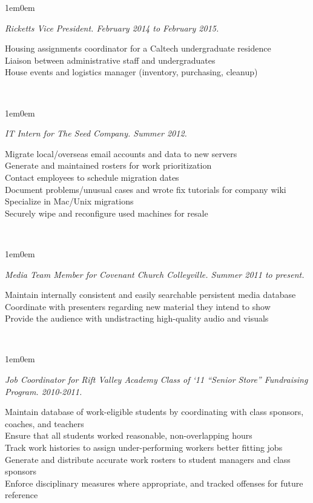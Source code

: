 \documentclass[10pt,letterpaper, full]{article}
\newcommand{\pjtitle}[1]{\renewcommand{\givenpjtitle}{#1}}
\newcommand{\pjtime}[1]{\renewcommand{\givenpjtime}{#1}}
\newcommand{\pjbody}[1]{\renewcommand{\givenpjbody}{#1}}
\newcommand{\givenpjtitle}{REQUIRED!}
\newcommand{\givenpjtime}{REQUIRED!}
\newcommand{\givenpjbody}{REQUIRED!}
\newenvironment{projectenv}
    {
        \begin{adjustwidth}{1em}{0em}
    }
    {
        \textit{\givenpjtitle. \givenpjtime.}

        \begin{minipage}[l]{\textwidth}
            \givenpjbody%
        \end{minipage}\\%


        \end{adjustwidth}
    }
\begin{document}
\begin{projectenv}%
    \pjtitle{Ricketts Vice President}
    \pjtime{February 2014 to February 2015}
    \pjbody{
        Housing assignments coordinator for a Caltech undergraduate residence\\
        Liaison between administrative staff and undergraduates\\
        House events and logistics manager (inventory, purchasing, cleanup)\\
    }
\end{projectenv}%
\bigskip
\begin{projectenv}%
    \pjtitle{IT Intern for The Seed Company}
    \pjtime{Summer 2012}
    \pjbody{
        Migrate local/overseas email accounts and data to new servers\\
        Generate and maintained rosters for work prioritization\\
        Contact employees to schedule migration dates\\
        Document problems/unusual cases and wrote fix tutorials for company wiki\\
        Specialize in Mac/Unix migrations\\
        Securely wipe and reconfigure used machines for resale\\
    }
\end{projectenv}%

\begin{projectenv}%
    \pjtitle{Media Team Member for Covenant Church Colleyville}
    \pjtime{Summer 2011 to present}
    \pjbody{
        Maintain internally consistent and easily searchable persistent media database\\
        Coordinate with presenters regarding new material they intend to show\\
        Provide the audience with undistracting high-quality audio and visuals\\
    }
\end{projectenv}%

\begin{projectenv}%
    \pjtitle{Job Coordinator for Rift Valley Academy Class of ‘11 “Senior Store” Fundraising Program}
    \pjtime{2010-2011}
    \pjbody{
        Maintain database of work-eligible students by coordinating with class sponsors, coaches, and teachers\\
        Ensure that all students worked reasonable, non-overlapping hours\\
        Track work histories to assign under-performing workers better fitting jobs\\
        Generate and distribute accurate work rosters to student managers and class sponsors\\
        Enforce disciplinary measures where appropriate, and tracked offenses for future reference\\
    }
\end{projectenv}%
\end{document}
